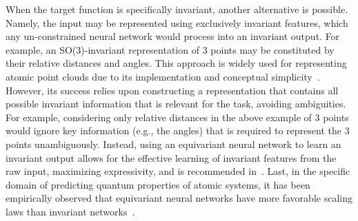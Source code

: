 When the target function is specifically invariant, another alternative is possible. Namely, 
the input may be represented using exclusively invariant features, which any un-constrained neural network
would process into an invariant output. For example, an SO(3)-invariant representation of 3 points may be
constituted by their relative distances and angles. This approach is widely used for representing atomic point
clouds due to its implementation and conceptual simplicity~\citep{dauparas_robust_2022, schutt_schnet_2017}.
However, its success relies upon constructing a representation that contains all possible invariant information
that is relevant for the task, avoiding ambiguities. For example, considering only relative distances in
the above example of 3 points would ignore key information (e.g., the angles) that is required to represent the
3 points unambiguously. Instead, using an equivariant neural network to learn an invariant output allows
for the effective learning of invariant features from the raw input, maximizing expressivity, and is recommended
in~\citep{bronstein_geometric_2021}.
Last, in the specific domain of predicting quantum properties of atomic systems, it has been empirically observed
that equivariant neural networks have more favorable scaling laws than invariant networks~\citep{batzner_e3-equivariant_2022}.


